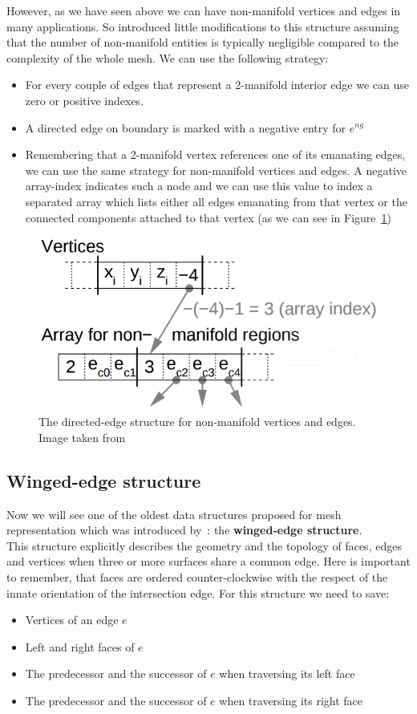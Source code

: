 However, as we have seen above we can have non-manifold vertices and edges in many applications. So \cite{Campagna} introduced little modifications to this structure assuming that the number of non-manifold entities is typically 
negligible compared to the complexity of the whole mesh. We can use the following strategy:
\begin{itemize}
 \item For every couple of edges that represent a 2-manifold interior edge we can use zero or positive indexes.
 \item A directed edge on boundary is marked with a negative entry for $e^{ng}$
 \item Remembering that a 2-manifold vertex references one of its emanating edges, we can use the same strategy for non-manifold vertices and edges. A negative array-index indicates such a node and we can use this value to index a separated array which lists either all edges emanating from that vertex or the connected components attached to that vertex (as we can see in Figure~\ref{fig:directedEdge2})
\end{itemize}

\begin{figure}[htb] %
   \centering
   \includegraphics[width=0.45\linewidth]{images/directed-edge2.png}
   \caption[The directed-edge structure for non-manifold vertices and edges]{The directed-edge structure for non-manifold vertices and edges. Image taken from~\cite{Campagna}}
   \label{fig:directedEdge2}
\end{figure}

\subsection{Winged-edge structure}

Now we will see one of the oldest data structures proposed for mesh representation which was introduced by~\cite{Baumgart}: the \textbf{winged-edge structure}.\\
This structure explicitly describes the geometry and the topology of faces, edges and vertices when three or more surfaces share a common edge. Here is important to remember, that faces are ordered counter-clockwise with the respect of the innate orientation of the intersection edge. For this structure we need to save:
\begin{itemize}
 \item Vertices of an edge $e$
 \item Left and right faces of $e$
 \item The predecessor and the successor of $e$ when traversing its left face
 \item The predecessor and the successor of $e$ when traversing its right face
\end{itemize}

